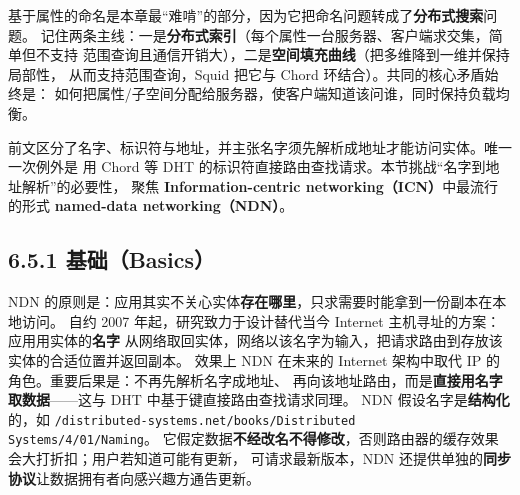 \begin{closeread}
\end{closeread}

\begin{commentary}
基于属性的命名是本章最“难啃”的部分，因为它把命名问题转成了\textbf{分布式搜索}问题。
记住两条主线：一是\textbf{分布式索引}（每个属性一台服务器、客户端求交集，简单但不支持
范围查询且通信开销大），二是\textbf{空间填充曲线}（把多维降到一维并保持局部性，
从而支持范围查询，Squid 把它与 Chord 环结合）。共同的核心矛盾始终是：
如何把属性/子空间分配给服务器，使客户端知道该问谁，同时保持负载均衡。
\end{commentary}



前文区分了名字、标识符与地址，并主张名字须先解析成地址才能访问实体。唯一一次例外是
用 Chord 等 DHT 的标识符直接路由查找请求。本节挑战“名字到地址解析”的必要性，
聚焦 \textbf{Information-centric networking（ICN）}中最流行的形式
\textbf{named-data networking（NDN）}。

\subsection*{6.5.1 基础（Basics）}
NDN 的原则是：应用其实不关心实体\textbf{存在哪里}，只求需要时能拿到一份副本在本地访问。
自约 2007 年起，研究致力于设计替代当今 Internet 主机寻址的方案：应用用实体的\textbf{名字}
从网络取回实体，网络以该名字为输入，把请求路由到存放该实体的合适位置并返回副本。
效果上 NDN 在未来的 Internet 架构中取代 IP 的角色。重要后果是：不再先解析名字成地址、
再向该地址路由，而是\textbf{直接用名字取数据}——这与 DHT 中基于键直接路由查找请求同理。
NDN 假设名字是\textbf{结构化}的，如
\texttt{/distributed-systems.net/books/Distributed Systems/4/01/Naming}。
它假定数据\textbf{不经改名不得修改}，否则路由器的缓存效果会大打折扣；用户若知道可能有更新，
可请求最新版本，NDN 还提供单独的\textbf{同步协议}让数据拥有者向感兴趣方通告更新。

